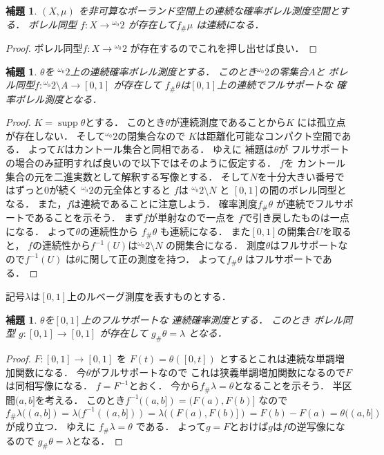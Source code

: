 \documentclass[leqno, 12pt]{jsarticle}
\newtheorem{lem}[thm]{補題}
\DeclareMathOperator{\supp}{supp}
\newcommand{\myomega}{\omega_{0}}
\newcommand{\mycantor}{{}^{\myomega}2}
\newcommand{\myppp}[2]{#1_{\#}#2}
\begin{document}
\begin{lem}\label{lem:meaeq1}
$(X, \mu)$
を非可算なポーランド空間上の連続な確率ボレル測度空間とする．
ボレル同型
$f\colon X\to \mycantor$
が存在して$\myppp{f}{\mu}$
は連続になる．
\end{lem}
\begin{proof}
ボレル同型$f\colon X\to \mycantor$
が存在するのでこれを押し出せば良い．
\end{proof}



\begin{lem}\label{lem:fulltheta}
$\theta$を
$\mycantor$上の連続確率ボレル測度とする．
このとき$\mycantor$の零集合$A$と
ボレル同型$f\colon \mycantor\setminus A\to [0, 1]$
が存在して
$\myppp{f}{\theta}$は$[0, 1]$上の連続でフルサポートな
確率ボレル測度となる．
\end{lem}
\begin{proof}
$K=\supp \theta$とする．
このとき$\theta$が連続測度であることから$K$
には孤立点が存在しない．
そして$\mycantor$の閉集合なので
$K$は距離化可能なコンパクト空間である．
よって$K$はカントール集合と同相である．
ゆえに
補題は$\theta$が
フルサポートの場合のみ証明すれば良いので以下ではそのように仮定する．
$f$を
カントール集合の元を二進実数として解釈する写像とする．
そして$N$を十分大きい番号ではずっと$0$が続く
$\mycantor$の元全体とすると
$f$は
$\mycantor\setminus N$
と
$[0, 1]$の間のボレル同型となる．
また，$f$は連続であることに注意しよう．
確率測度$\myppp{f}{\theta}$
が連続でフルサポートであることを示そう．
まず$f$が単射なので一点を
$f$で引き戻したものは一点になる．
よって$\theta$の連続性から
$\myppp{f}{\theta}$
も連続になる．
また$[0, 1]$の開集合$U$を取ると，
$f$の連続性から$f^{-1}(U)$は$\mycantor\setminus N$
の開集合になる．
測度$\theta$はフルサポートなので$f^{-1}(U)$
は$\theta$に関して正の測度を持つ．
よって$\myppp{f}{\theta}$
はフルサポートである．
\end{proof}




記号$\lambda$は$[0, 1]$上のルベーグ測度を表すものとする．

\begin{lem}\label{lem:01push}
$\theta$を$[0, 1]$上のフルサポートな
連続確率測度とする．
このとき
ボレル同型
$g\colon [0, 1] \to 
[0, 1] $
が存在して
$\myppp{g}{\theta}=\lambda$
となる．
\end{lem}
\begin{proof}
$F\colon [0, 1]\to [0, 1]$
を
$F(t)=\theta([0, t])$
とするとこれは連続な単調増加関数になる．
今$\theta$がフルサポートなので
これは狭義単調増加関数になるので$F$は同相写像になる．
$f=F^{-1}$とおく．
今から$\myppp{f}{\lambda}=\theta$となることを示そう．
半区間$(a, b]$を考える．
このとき$f^{-1}((a, b])=(F(a), F(b)]$
なので
\[
\myppp{f}{\lambda}((a, b])=
\lambda(f^{-1}((a, b]))
=
\lambda((F(a), F(b)])
=
F(b)-F(a)=\theta((a, b])
\]
が成り立つ．
ゆえに
$\myppp{f}{\lambda}=\theta$
である．
よって$g=F$とおけば$g$は$f$の逆写像になるので
$\myppp{g}{\theta}=\lambda$となる．
\end{proof}
\end{document}
